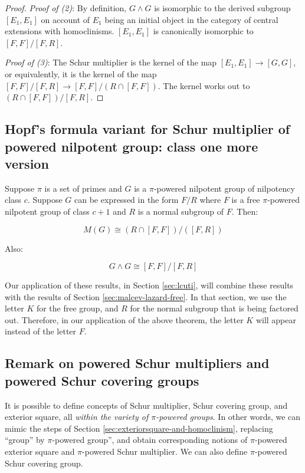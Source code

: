 \documentclass{ucetd}
\begin{document}
\begin{proof}
  {\em Proof of (2)}: By definition, $G \wedge G$ is isomorphic to the
  derived subgroup $[E_1,E_1]$ on account of $E_1$ being an initial
  object in the category of central extensions with
  homoclinisms. $[E_1,E_1]$ is canonically isomorphic to
  $[F,F]/[F,R]$.

  {\em Proof of (3)}: The Schur multiplier is the kernel of the map
  $[E_1,E_1] \to [G,G]$, or equivalently, it is the kernel of the map
  $[F,F]/[F,R] \to [F,F]/(R \cap [F,F])$. The kernel works out to $(R
  \cap [F,F])/[F,R]$.
\end{proof}


\subsection{Hopf's formula variant for Schur multiplier of powered nilpotent group: class one more version}\label{sec:hopf-formula-pi-powered-class-one-more}

Suppose $\pi$ is a set of primes and $G$ is a $\pi$-powered nilpotent
group of nilpotency class $c$. Suppose $G$ can be expressed in the
form $F/R$ where $F$ is a free $\pi$-powered nilpotent group of class
$c + 1$ and $R$ is a normal subgroup of $F$. Then:

\begin{equation}\label{eq:pi-powered-hopf-formula-class-one-more}
  M(G) \cong (R \cap [F,F])/([F,R])
\end{equation}

Also:

\begin{equation}\label{eq:pi-powered-exteriorsquare-hopf-formula-class-one-more}
  G \wedge G \cong [F,F]/[F,R]
\end{equation}

Our application of these results, in Section \ref{sec:lcuti}, will
combine these results with the results of Section
\ref{sec:malcev-lazard-free}. In that section, we use the letter $K$
for the free group, and $R$ for the normal subgroup that is being
factored out. Therefore, in our application of the above theorem, the
letter $K$ will appear instead of the letter $F$.

\subsection{Remark on powered Schur multipliers and powered Schur covering groups}

It is possible to define concepts of Schur multiplier, Schur covering
group, and exterior square, all {\em within the variety of
  $\pi$-powered groups}. In other words, we can mimic the steps of
Section \ref{sec:exteriorsquare-and-homoclinism}, replacing ``group''
by $\pi$-powered group'', and obtain corresponding notions of
$\pi$-powered exterior square and $\pi$-powered Schur multiplier. We
can also define $\pi$-powered Schur covering group.
\end{document}
